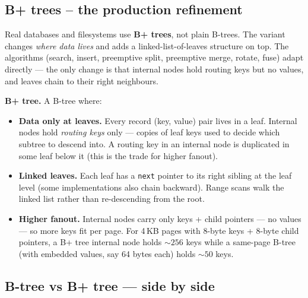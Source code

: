 \documentclass[11pt]{article}
\begin{document}
\subsection*{B+ trees -- the production refinement}

Real databases and filesystems use \textbf{B+ trees}, not plain
B-trees. The variant changes \emph{where data lives} and adds a
linked-list-of-leaves structure on top. The algorithms (search,
insert, preemptive split, preemptive merge, rotate, fuse) adapt
directly --- the only change is that internal nodes hold routing
keys but no values, and leaves chain to their right neighbours.

\begin{defnbox}
\textbf{B+ tree.} A B-tree where:
\begin{itemize}[leftmargin=*]
    \item \textbf{Data only at leaves.} Every record (key, value)
          pair lives in a leaf. Internal nodes hold \emph{routing
          keys} only --- copies of leaf keys used to decide which
          subtree to descend into. A routing key in an internal node
          is duplicated in some leaf below it (this is the trade for
          higher fanout).
    \item \textbf{Linked leaves.} Each leaf has a
          \texttt{next} pointer to its right sibling at the leaf
          level (some implementations also chain backward). Range
          scans walk the linked list rather than re-descending from
          the root.
    \item \textbf{Higher fanout.} Internal nodes carry only keys +
          child pointers --- no values --- so more keys fit per
          page. For 4\,KB pages with 8-byte keys + 8-byte child
          pointers, a B+ tree internal node holds $\sim 256$ keys
          while a same-page B-tree (with embedded values, say 64
          bytes each) holds $\sim 50$ keys.
\end{itemize}
\end{defnbox}

\subsection*{B-tree vs B+ tree --- side by side}
\end{document}
